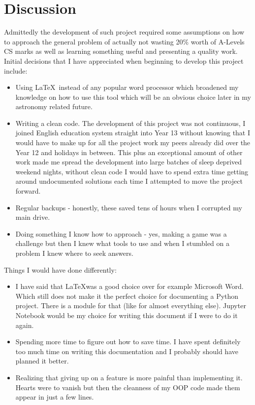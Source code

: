 \documentclass[11pt,a4paper,notitlepage]{report}
\begin{document}
		\section{Discussion}
			Admittedly the development of such project required some assumptions on how to approach the general problem of actually not wasting 20\% worth of A-Levels CS marks as well as learning something useful and presenting a quality work. Initial decisions that I have appreciated when beginning to develop this project include:
			\begin{itemize}
				\item
				Using \LaTeX\ instead of any popular word processor which broadened my knowledge on how to use this tool which will be an obvious choice later in my astronomy related future.
				\item
				Writing a clean code. The development of this project was not continuous, I joined English education system straight into Year 13 without knowing that I would have to make up for all the project work my peers already did over the Year 12 and holidays in between. This plus an exceptional amount of other work made me spread the development into large batches of sleep deprived weekend nights, without clean code I would have to spend extra time getting around undocumented solutions each time I attempted to move the project forward.
				\item
				Regular backups - honestly, these saved tens of hours when I corrupted my main drive.
				\item
				Doing something I know how to approach - yes, making a game was a challenge but then I knew what tools to use and when I stumbled on a problem I knew where to seek answers.
			\end{itemize}
		Things I would have done differently:
			\begin{itemize}
				\item
				I have said that \LaTeX was a good choice over for example Microsoft Word. Which still does not make it the perfect choice for documenting a Python project. There is a module for that (like for almost everything else). Jupyter Notebook would be my choice for writing this document if I were to do it again.
				\item
				Spending more time to figure out how to save time. I have spent definitely too much time on writing this documentation and I probably should have planned it better.
				\item
				Realizing that giving up on a feature is more painful than implementing it. Hearts were to vanish but then the cleanness of my OOP code made them appear in just a few lines.  
			\end{itemize}
\end{document}
